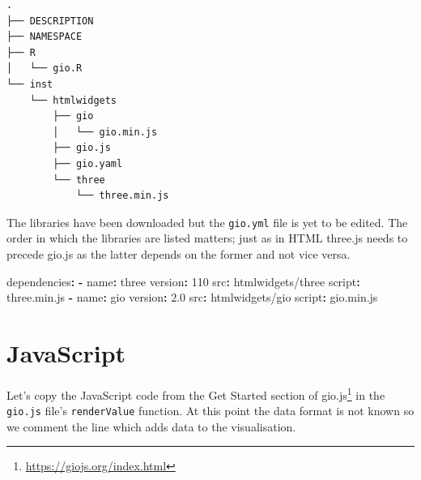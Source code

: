 \documentclass[
]{krantz}
\makeatletter
\newenvironment{Shaded}{\begin{snugshade}}{\end{snugshade}}
\newcommand{\AttributeTok}[1]{\textcolor[rgb]{0.61,0.61,0.61}{#1}}
\newcommand{\DecValTok}[1]{\textcolor[rgb]{0.06,0.06,0.06}{#1}}
\newcommand{\FloatTok}[1]{\textcolor[rgb]{0.06,0.06,0.06}{#1}}
\newcommand{\FunctionTok}[1]{\textcolor[rgb]{0,0,0}{#1}}
\newcommand{\KeywordTok}[1]{\textcolor[rgb]{0.27,0.27,0.27}{\textbf{#1}}}
\renewcommand{\href}[2]{#2\footnote{\url{#1}}}
\newenvironment{kframe}{%
\medskip{}
\setlength{\fboxsep}{.8em}
 \def\at@end@of@kframe{}%
 \ifinner\ifhmode%
  \def\at@end@of@kframe{\end{minipage}}%
  \begin{minipage}{\columnwidth}%
 \fi\fi%
 \def\FrameCommand##1{\hskip\@totalleftmargin \hskip-\fboxsep
 \colorbox{shadecolor}{##1}\hskip-\fboxsep
     \hskip-\linewidth \hskip-\@totalleftmargin \hskip\columnwidth}%
 \MakeFramed {\advance\hsize-\width
   \@totalleftmargin\z@ \linewidth\hsize
   \@setminipage}}%
 {\par\unskip\endMakeFramed%
 \at@end@of@kframe}
\renewenvironment{Shaded}{\begin{kframe}}{\end{kframe}}
\makeatother
\begin{document}
\begin{verbatim}
.
├── DESCRIPTION
├── NAMESPACE
├── R
│   └── gio.R
└── inst
    └── htmlwidgets
        ├── gio
        │   └── gio.min.js
        ├── gio.js
        ├── gio.yaml
        └── three
            └── three.min.js
\end{verbatim}

The libraries have been downloaded but the \texttt{gio.yml} file is yet to be edited. The order in which the libraries are listed matters; just as in HTML three.js needs to precede gio.js as the latter depends on the former and not vice versa.

\begin{Shaded}
\begin{Highlighting}[]
\FunctionTok{dependencies}\KeywordTok{:}
\AttributeTok{  }\KeywordTok{{-}}\AttributeTok{ }\FunctionTok{name}\KeywordTok{:}\AttributeTok{ three}
\AttributeTok{    }\FunctionTok{version}\KeywordTok{:}\AttributeTok{ }\DecValTok{110}
\AttributeTok{    }\FunctionTok{src}\KeywordTok{:}\AttributeTok{ htmlwidgets/three}
\AttributeTok{    }\FunctionTok{script}\KeywordTok{:}\AttributeTok{ three.min.js}
\AttributeTok{  }\KeywordTok{{-}}\AttributeTok{ }\FunctionTok{name}\KeywordTok{:}\AttributeTok{ gio}
\AttributeTok{    }\FunctionTok{version}\KeywordTok{:}\AttributeTok{ }\FloatTok{2.0}
\AttributeTok{    }\FunctionTok{src}\KeywordTok{:}\AttributeTok{ htmlwidgets/gio}
\AttributeTok{    }\FunctionTok{script}\KeywordTok{:}\AttributeTok{ gio.min.js}
\end{Highlighting}
\end{Shaded}

\hypertarget{widgets-full-js}{%
\section{JavaScript}\label{widgets-full-js}}

Let's copy the JavaScript code from the \href{https://giojs.org/index.html}{Get Started section of gio.js} in the \texttt{gio.js} file's \texttt{renderValue} function. At this point the data format is not known so we comment the line which adds data to the visualisation.
\end{document}
